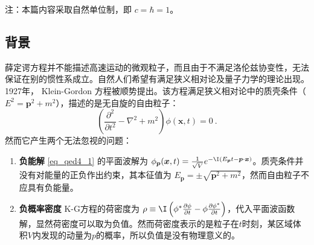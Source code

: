 

注：本篇内容采取自然单位制，即 $c=\hbar=1$。
\subsection{背景}
薛定谔方程并不能描述高速运动的微观粒子，而且由于不满足洛伦兹协变性，无法保证在别的惯性系成立。自然人们希望有满足狭义相对论及量子力学的理论出现。1927年， Klein-Gordon 方程被顺势提出。该方程满足狭义相对论中的质壳条件（$E^{2}=\boldsymbol{p}^{2}+m^{2}$），描述的是无自旋的自由粒子：
\begin{equation}\label{eq_qed4_1}
\left(\frac{\partial^{2}}{\partial t^{2}}-\nabla^{2}+m^{2}\right) \phi(\boldsymbol{x}, t)=0~.
\end{equation}
然而它产生两个无法忽视的问题：

\begin{enumerate}
\item \textbf{负能解}
\autoref{eq_qed4_1} 的平面波解为 $\phi_{\boldsymbol{p}}(\boldsymbol{x}, t)=\frac{1}{\sqrt{V}} e^{- \I\left(E_{\boldsymbol{p}} t-\boldsymbol{p} \cdot \boldsymbol{x}\right)}$。质壳条件并没有对能量的正负作出约束，其本征值为
$E_{\boldsymbol{p}}=\pm \sqrt{\boldsymbol{p}^{2}+m^{2}}$，然而自由粒子不应具有负能量。
\item \textbf{负概率密度}
K-G方程的荷密度为 $\rho \equiv  \I\left(\phi^{*} \frac{\partial \phi}{\partial t}-\phi \frac{\partial \phi^{*}}{\partial t}\right)$，代入平面波函数解，显然荷密度可以取为负值。然而荷密度表示的是粒子在$t$时刻，某区域体积$V$内发现的动量为$p$的概率，所以负值是没有物理意义的。
\end{enumerate}
